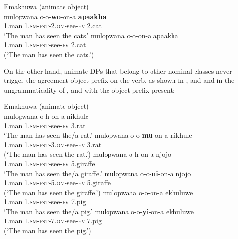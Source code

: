\documentclass[output=paper]{langsci/langscibook}
\begin{document}
\ea\label{ex:nguna:6} {Emakhuwa (animate object)}\\
\ea\label{ex:nguna:6a}
\gll mulopwana           o-o-\textbf{wo}-on-a                    \textbf{apaakha}\\
     1.man                   1.{\textsc{sm-pst}}-2.\textsc{om}-see-{\textsc{fv}}      {2.cat}\\
\glt  ‘The man has seen the cats.’
\ex\label{ex:nguna:6b}
\gll *mulopwana         o-o-on-a                         apaakha\\
     1.man                    1{\textsc{.sm-pst}}{-see-}{\textsc{fv}}             {2.cat}\\
\glt (‘The man has seen the cats.’)
\z
\z

On the other hand, animate DPs that belong to other nominal classes never trigger the agreement object prefix on the verb, as shown in ,  and  and in the ungrammaticality of ,  and  with the object prefix  present:


\ea\label{ex:nguna:7} {Emakhuwa (animate object)}\\
\ea\label{ex:nguna:7a}
\gll mulopwana          o-h-on-a                       nikhule\\
     1.man {\textsc{1.sm-pst}}{-see-}{\textsc{fv}}            {3.rat}\\
\glt ‘The man has seen the/a rat.’
\ex\label{ex:nguna:7b}
\gll *mulopwana        o-o-\textbf{mu}-on-a                        nikhule\\
     1.man                  1.{\textsc{sm-pst}}{-3.}{\textsc{om-}}{see}{\textsc{-fv}}         {3.rat}\\
\glt (‘The man has seen the rat.’)
\ex\label{ex:nguna:7c}
\gll mulopwana         o\textup{-}h-on-a                       njojo\\
     1.man                 {\textsc{1.sm-pst}}{-see-}{\textsc{fv}}           {5.giraffe}\\
\glt ‘The man has seen the/a giraffe.’
\ex\label{ex:nguna:7d}
\gll *mulopwana        o-o-\textbf{ni}-on-a                         njojo\\
     1.man                  1{\textsc{.sm-pst}}{-5.}{\textsc{om}}{-see-}{\textsc{fv}}        {5.giraffe}\\
\glt (‘The man has seen the giraffe.’)
\ex\label{ex:nguna:7e}
\gll mulopwana           o-o-on-a                           ekhuluwe\\
     1.man                   1.{\textsc{sm-pst}}{-see-}{\textsc{fv}}               {7.pig}\\
\glt ‘The man has seen the/a pig.’
\ex\label{ex:nguna:7f}
\gll *mulopwana         o-o-\textbf{yi}-on-a                           ekhuluwe\\
     1.man                   1.{\textsc{sm-pst}}{-7.}{\textsc{om}}{-see-}{\textsc{fv}}          {7.pig}\\
\glt (‘The man has seen the pig.’)
\z
\z
\end{document}
